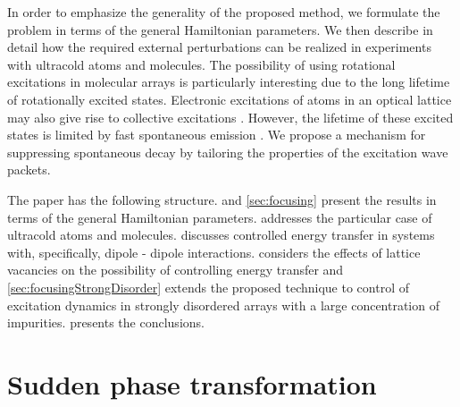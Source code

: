 In order to emphasize the generality of the proposed method, we formulate the 
problem in terms of the general Hamiltonian parameters. We then describe in detail how the required external 
perturbations can be realized in experiments with ultracold atoms and molecules. The possibility of using rotational 
excitations in molecular arrays is particularly interesting due to the long lifetime of rotationally excited states. 
Electronic excitations of atoms in an optical lattice may also give rise to collective excitations \cite{Zoubi1}. However, the 
lifetime of these excited states is limited by fast spontaneous emission \cite{electronic-exciton1, electronic-exciton2}. We propose a mechanism for 
suppressing spontaneous decay by tailoring the properties of the excitation wave packets. 


The paper has the following structure.  and \autoref{sec:focusing} present the results in terms of the general 
Hamiltonian parameters.   addresses the particular case of ultracold atoms and molecules.
 discusses controlled energy transfer in systems with, specifically, 
dipole - dipole interactions.  considers the effects of lattice vacancies on the possibility of controlling 
energy transfer and \autoref{sec:focusingStrongDisorder} extends the proposed technique to
control of excitation dynamics in strongly disordered arrays with a large
concentration of impurities.  presents the conclusions.

\section{Sudden phase transformation}
\label{sec:phaseKicking}

